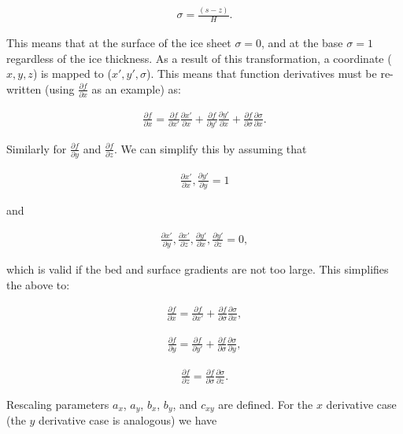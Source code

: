 \begin{align*}
\sigma = \frac{(s - z)}{H}.
\end{align*}

This means that at the surface of the ice sheet $\sigma = 0$, and at the base $\sigma = 1$ regardless of the ice thickness.  As a result of this transformation, a coordinate ($x,y,z$) is mapped to ($x',y',\sigma$).  This means that function derivatives must be re-written (using $\frac{\partial f}{\partial x}$ as an example) as:

\begin{align*}
\frac{\partial f}{\partial x} = \frac{\partial f}{\partial x'} \frac{\partial x'}{\partial x} + \frac{\partial f}{\partial y'} \frac{\partial y'}{\partial x} + \frac{\partial f}{\partial \sigma} \frac{\partial \sigma}{\partial x}.
\end{align*}

Similarly for $\frac{\partial f}{\partial y}$ and $\frac{\partial f}{\partial z}$. We can simplify this by assuming that 

\begin{align*}
\frac{\partial x'}{\partial x}, \frac{\partial y'}{\partial y} = 1
\end{align*}

and

\begin{align*}
\frac{\partial x'}{\partial y}, \frac{\partial x'}{\partial z}, \frac{\partial y'}{\partial x}, \frac{\partial y'}{\partial z} = 0,
\end{align*}

which is valid if the bed and surface gradients are not too large. This simplifies the above to:

\begin{align*}
\frac{\partial f}{\partial x} = \frac{\partial f}{\partial x'} + \frac{\partial f}{\partial \sigma}\frac{\partial \sigma}{\partial x},
\end{align*}

\begin{align*}
\frac{\partial f}{\partial y} = \frac{\partial f}{\partial y'} + \frac{\partial f}{\partial \sigma}\frac{\partial \sigma}{\partial y},
\end{align*}

\begin{align*}
\frac{\partial f}{\partial z} = \frac{\partial f}{\partial \sigma}\frac{\partial \sigma}{\partial z}.
\end{align*}

Rescaling parameters $a_{x}$, $a_{y}$, $b_{x}$, $b_{y}$, and $c_{xy}$ are defined. For the $x$ derivative case (the $y$ derivative case is analogous) we have

